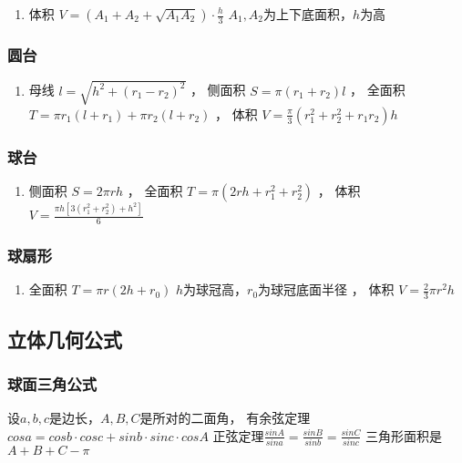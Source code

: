 \documentclass[landscape,a4paper]{article}
\begin{document}
\begin{spacing}{0.3}
\begin{multicols}{2}
\begin{enumerate}
	\item 体积
		$V=(A_1+A_2+\sqrt{A_1A_2}) \cdot \frac{h}{3}$
		$A_1,A_2$为上下底面积，$h$为高
\end{enumerate}

\subsubsection{圆台}

\begin{enumerate}
	\item 母线
		$l=\sqrt{h^2+(r_1-r_2)^2}$
	，  侧面积
		$S=\pi(r_1+r_2)l$
	，  全面积
		$T=\pi r_1(l+r_1)+\pi r_2(l+r_2)$
	，  体积
		$V=\frac{\pi}{3}(r_1^2+r_2^2+r_1r_2)h$
\end{enumerate}

\subsubsection{球台}

\begin{enumerate}
	\item 侧面积
		$S=2\pi rh$
	，    全面积
		$T=\pi(2rh+r_1^2+r_2^2)$
	，    体积
		$V=\frac{\pi h[3(r_1^2+r_2^2)+h^2]}{6}$
\end{enumerate}

\subsubsection{球扇形}

\begin{enumerate}
	\item 全面积
		$T=\pi r(2h+r_0)$
		$h$为球冠高，$r_0$为球冠底面半径
	，   体积
		$V=\frac{2}{3}\pi r^2h$
\end{enumerate}

\subsection{立体几何公式}

\subsubsection{球面三角公式}

设$a, b, c$是边长，$A, B, C$是所对的二面角，
有余弦定理$cos a = cos b \cdot cos c + sin b \cdot sin c \cdot cos A$
正弦定理$\frac{sin A}{sin a} = \frac{sin B}{sin b} = \frac{sin C}{sin c}$
三角形面积是$A + B + C - \pi$


\end{multicols}
\end{spacing}
\end{document}

